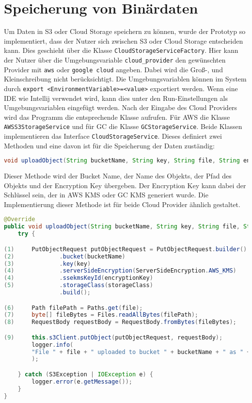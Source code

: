 \newpage

\section{Speicherung von Binärdaten}

Um Daten in S3 oder Cloud Storage speichern zu können, wurde der Prototyp so implementiert, dass der Nutzer sich zwischen S3 oder Cloud Storage entscheiden kann. Dies geschieht über die Klasse \verb|CloudStorageServiceFactory|. Hier kann der Nutzer über die Umgebungsvariable \verb|cloud_provider| den gewünschten Provider mit \verb|aws| oder \verb|google cloud| angeben. Dabei wird die Groß-, und Kleinschreibung nicht berücksichtigt. Die Umgebungsvariablen können im System durch \verb|export <EnvironmentVariable>=<value>| exportiert werden. Wenn eine IDE wie Intellij verwendet wird, kann dies unter den Run-Einstellungen als Umgebungsvariablen eingefügt werden. Nach der Eingabe des Cloud Providers wird das Programm die entsprechende Klasse aufrufen. Für AWS die Klasse \verb|AWSS3StorageService| und für GC die Klasse \verb|GCStorageService|. Beide Klassen implementieren das Interface \verb|CloudStorageService|. Dieses definiert zwei Methoden und eine davon ist für die Speicherung der Daten zuständig:

\begin{lstlisting}[language=Java]
void uploadObject(String bucketName, String key, String file, String encryptionKey, String storageClass) throws IOException;
\end{lstlisting}
	
Dieser Methode wird der Bucket Name, der Name des Objekts, der Pfad des Objekts und der Encryption Key übergeben. Der Encryption Key kann dabei der Schlüssel sein, der in AWS KMS oder GC KMS generiert wurde. Die Implementierung dieser Methode ist für beide Cloud Provider ähnlich gestaltet.

\begin{lstlisting}[language=Java, caption=Prototyp Code Snippet - Hochladen eines Objekts nach S3]
@Override
public void uploadObject(String bucketName, String key, String file, String encryptionKey, String storageClass) {
    try {

(1)     PutObjectRequest putObjectRequest = PutObjectRequest.builder()
(2)             .bucket(bucketName)
(3)             .key(key)
(4)             .serverSideEncryption(ServerSideEncryption.AWS_KMS)
(4)             .ssekmsKeyId(encryptionKey)
(5)             .storageClass(storageClass)
                .build();

(6)     Path filePath = Paths.get(file);
(7)     byte[] fileBytes = Files.readAllBytes(filePath);
(8)     RequestBody requestBody = RequestBody.fromBytes(fileBytes);

(9)     this.s3Client.putObject(putObjectRequest, requestBody);
        logger.info(
        "File " + file + " uploaded to bucket " + bucketName + " as " + key
        );

    } catch (S3Exception | IOException e) {
        logger.error(e.getMessage());
    }
}
\end{lstlisting}

